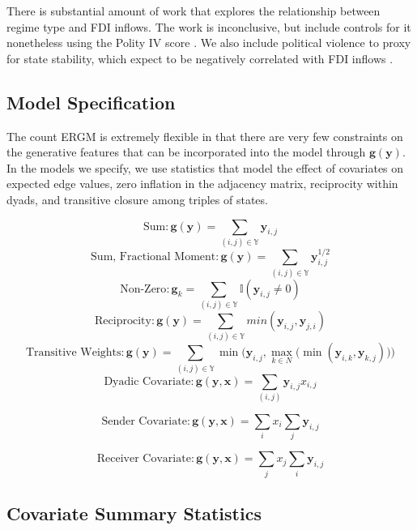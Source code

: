 \documentclass{article}
\begin{document}
There is substantial amount of work that explores the relationship between regime type and FDI inflows. The work is inconclusive, but include controls for it nonetheless using the Polity IV score \citep{polity2012polity}. We also include political violence to proxy for state stability, which expect to be negatively correlated with FDI inflows \citep{marshall2005major}.

\subsection{Model Specification}
The count ERGM is extremely flexible in that there are very few constraints on the generative features that can be incorporated into the model through $\bm{g}( \bm{y} )$. In the models we specify, we use statistics that model the effect of covariates on expected edge values, zero inflation in the adjacency matrix, reciprocity within dyads, and transitive closure among triples of states. 

$$\text{Sum}:\bm{g(y)} = \sum_{(i,j) {\in} \mathbb{Y}}\bm{y}_{i,j}$$
$$\text{Sum, Fractional Moment}:\bm{g(y)} = \sum_{(i,j) {\in} \mathbb{Y}}\bm{y}_{i,j}^{1/2}$$
$$\text{Non-Zero}: \bm{g}_k = \sum_{(i,j) {\in} \mathbb{Y}} \mathbb{I}(\bm{y}_{i,j} \neq 0)$$
$$ \text{Reciprocity}: \bm{g(y)} = \sum_{(i,j) {\in} \mathbb{Y}}min(\bm{y}_{i,j},\bm{y}_{j,i})$$
$$\text{Transitive Weights}: \bm{g(y)} =  \sum_{(i,j) {\in} \mathbb{Y}}\min\bigg( \bm{y}_{i,j}, \max\limits_{k{\in}N}\Big(\min(\bm{y}_{i,k},\bm{y}_{k,j})\Big) \bigg)$$
$$ \text{Dyadic Covariate}: \bm{g(y,x)} = \sum_{(i,j)} \bm{y}_{i,j}x_{i,j}$$

$$ \text{Sender Covariate}: \bm{g(y,x)} = \sum_{i}x_i \sum_{j} \bm{y}_{i,j}$$

$$ \text{Receiver Covariate}: \bm{g(y,x)} = \sum_{j}x_j \sum_{i} \bm{y}_{i,j}$$

\subsection{Covariate Summary Statistics}
\end{document}
